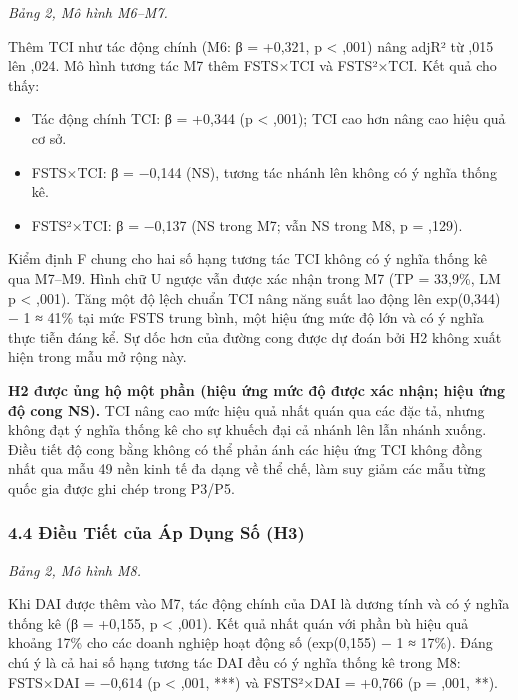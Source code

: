\documentclass[12pt,a4paper]{article}
\providecommand{\tightlist}{\setlength{\itemsep}{0pt}\setlength{\parskip}{0pt}}
\begin{document}
\emph{Bảng 2, Mô hình M6--M7.}

Thêm TCI như tác động chính (M6: β = +0,321, p \textless{} ,001) nâng
adjR² từ ,015 lên ,024. Mô hình tương tác M7 thêm FSTS×TCI và FSTS²×TCI.
Kết quả cho thấy:

\begin{itemize}
\tightlist
\item
  Tác động chính TCI: β = +0,344 (p \textless{} ,001); TCI cao hơn nâng
  cao hiệu quả cơ sở.
\item
  FSTS×TCI: β = −0,144 (NS), tương tác nhánh lên không có ý nghĩa thống
  kê.
\item
  FSTS²×TCI: β = −0,137 (NS trong M7; vẫn NS trong M8, p = ,129).
\end{itemize}

Kiểm định F chung cho hai số hạng tương tác TCI không có ý nghĩa thống
kê qua M7--M9. Hình chữ U ngược vẫn được xác nhận trong M7 (TP = 33,9\%,
LM p \textless{} ,001). Tăng một độ lệch chuẩn TCI nâng năng suất lao
động lên exp(0,344) − 1 ≈ 41\% tại mức FSTS trung bình, một hiệu ứng mức
độ lớn và có ý nghĩa thực tiễn đáng kể. Sự dốc hơn của đường cong được
dự đoán bởi H2 không xuất hiện trong mẫu mở rộng này.

\textbf{H2 được ủng hộ một phần (hiệu ứng mức độ được xác nhận; hiệu ứng
độ cong NS).} TCI nâng cao mức hiệu quả nhất quán qua các đặc tả, nhưng
không đạt ý nghĩa thống kê cho sự khuếch đại cả nhánh lên lẫn nhánh
xuống. Điều tiết độ cong bằng không có thể phản ánh các hiệu ứng TCI
không đồng nhất qua mẫu 49 nền kinh tế đa dạng về thể chế, làm suy giảm
các mẫu từng quốc gia được ghi chép trong P3/P5.

\hypertarget{44-ux111iux1ec1u-tiux1ebft-cux1ee7a-uxe1p-dux1ee5ng-sux1ed1-h3}{%
\subsubsection{4.4 Điều Tiết của Áp Dụng Số
(H3)}\label{44-ux111iux1ec1u-tiux1ebft-cux1ee7a-uxe1p-dux1ee5ng-sux1ed1-h3}}

\emph{Bảng 2, Mô hình M8.}

Khi DAI được thêm vào M7, tác động chính của DAI là dương tính và có ý
nghĩa thống kê (β = +0,155, p \textless{} ,001). Kết quả nhất quán với
phần bù hiệu quả khoảng 17\% cho các doanh nghiệp hoạt động số
(exp(0,155) − 1 ≈ 17\%). Đáng chú ý là cả hai số hạng tương tác DAI đều
có ý nghĩa thống kê trong M8: FSTS×DAI = −0,614 (p \textless{} ,001,
***) và FSTS²×DAI = +0,766 (p = ,001, **).
\end{document}
